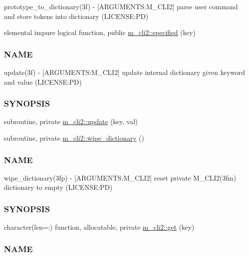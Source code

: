 \begin{DoxyCompactItemize}
\begin{DoxyCompactList}
prototype\+\_\+to\+\_\+dictionary(3f) -\/ \mbox{[}A\+R\+G\+U\+M\+E\+N\+TS\+:M\+\_\+\+C\+L\+I2\mbox{]} parse user command and store tokens into dictionary (L\+I\+C\+E\+N\+SE\+:PD) \end{DoxyCompactList}\item 
elemental impure logical function, public \mbox{\hyperlink{namespacem__cli2_a90118f308a5120041a5862fca4740367}{m\+\_\+cli2\+::specified}} (key)
\begin{DoxyCompactList}\small\item\em \subsubsection*{N\+A\+ME}

update(3f) -\/ \mbox{[}A\+R\+G\+U\+M\+E\+N\+TS\+:M\+\_\+\+C\+L\+I2\mbox{]} update internal dictionary given keyword and value (L\+I\+C\+E\+N\+SE\+:PD) \subsubsection*{S\+Y\+N\+O\+P\+S\+IS}\end{DoxyCompactList}\item 
subroutine, private \mbox{\hyperlink{namespacem__cli2_a160d56bc4a10faef7e8a8a4f04f4dadb}{m\+\_\+cli2\+::update}} (key, val)
\item 
subroutine, private \mbox{\hyperlink{namespacem__cli2_ab1525b0419475486f520ef502daa5e94}{m\+\_\+cli2\+::wipe\+\_\+dictionary}} ()
\begin{DoxyCompactList}\small\item\em \subsubsection*{N\+A\+ME}

wipe\+\_\+dictionary(3fp) -\/ \mbox{[}A\+R\+G\+U\+M\+E\+N\+TS\+:M\+\_\+\+C\+L\+I2\mbox{]} reset private M\+\_\+\+C\+L\+I2(3fm) dictionary to empty (L\+I\+C\+E\+N\+SE\+:PD) \subsubsection*{S\+Y\+N\+O\+P\+S\+IS}\end{DoxyCompactList}\item 
character(len=\+:) function, allocatable, private \mbox{\hyperlink{namespacem__cli2_aa92e8ad0300d4e324e29eae1ab9d04b4}{m\+\_\+cli2\+::get}} (key)
\begin{DoxyCompactList}\small\item\em \subsubsection*{N\+A\+ME}


\end{DoxyCompactList}
\end{DoxyCompactItemize}
